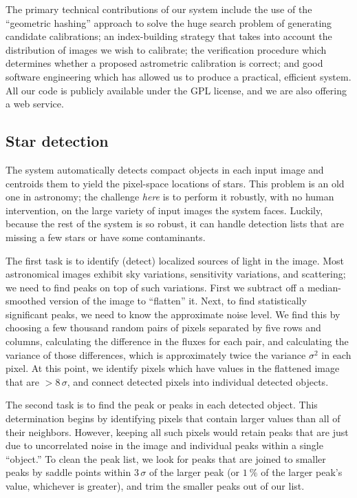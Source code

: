 
The primary technical contributions of our system include the use of
the ``geometric hashing'' \cite{lamdan1990, wolfson1997} approach to
solve the huge search problem of generating candidate calibrations; an
index-building strategy that takes into account the distribution of
images we wish to calibrate; the verification procedure which
determines whether a proposed astrometric calibration is correct; and
good software engineering which has allowed us to produce a practical,
efficient system.  All our code is publicly available under the GPL
license, and we are also offering a web service.


\subsection{Star detection}

The system automatically detects compact objects in each input image
and centroids them to yield the pixel-space locations of stars.  This
problem is an old one in astronomy; the challenge \emph{here} is to
perform it robustly, with no human intervention, on the large variety
of input images the system faces.  Luckily, because the rest of the
system is so robust, it can handle detection lists that are missing a
few stars or have some contaminants.

The first task is to identify (detect) localized sources of light in
the image.  Most astronomical images exhibit sky variations,
sensitivity variations, and scattering; we need to find peaks on top
of such variations.  First we subtract off a median-smoothed version
of the image to ``flatten'' it.  Next, to find statistically
significant peaks, we need to know the approximate noise level.  We
find this by choosing a few thousand random pairs of pixels separated
by five rows and columns, calculating the difference in the fluxes for
each pair, and calculating the variance of those differences, which is
approximately twice the variance $\sigma^2$ in each pixel.  At this
point, we identify pixels which have values in the flattened image
that are $>8\,\sigma$, and connect detected pixels into individual
detected objects.

The second task is to find the peak or peaks in each detected object.
This determination begins by identifying pixels that contain larger
values than all of their neighbors.  However, keeping all such pixels
would retain peaks that are just due to uncorrelated noise in the
image and individual peaks within a single ``object.''  To clean the
peak list, we look for peaks that are joined to smaller peaks by
saddle points within $3\,\sigma$ of the larger peak (or $1~\percent$
of the larger peak's value, whichever is greater), and trim the
smaller peaks out of our list.

